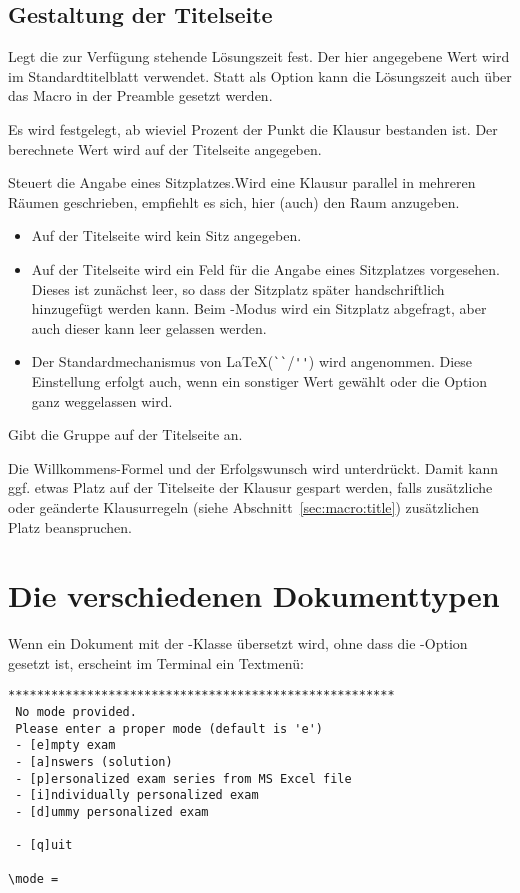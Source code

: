 \documentclass[
load=osgexam,
babel=ngerman
]{skdoc}
\begin{document}
\subsection*{Gestaltung der Titelseite}
Legt die zur Verfügung stehende Lösungszeit fest. Der hier angegebene Wert wird im Standardtitelblatt verwendet.
Statt als Option kann die Lösungszeit auch über das Macro  in der Preamble gesetzt werden.
\medskip

Es wird festgelegt, ab wieviel Prozent der Punkt die Klausur bestanden ist. Der berechnete Wert wird auf der Titelseite
angegeben.
\medskip

 Steuert die Angabe eines Sitzplatzes.Wird eine Klausur parallel in mehreren Räumen
geschrieben, empfiehlt es sich, hier (auch) den Raum anzugeben.
\begin{itemize}[nosep]
  \item [\opt{no}] Auf der Titelseite wird kein Sitz angegeben.
  \item [\opt{title}] Auf der Titelseite wird ein Feld für die Angabe eines
    Sitzplatzes vorgesehen. Dieses ist zunächst leer, so dass der Sitzplatz
    später handschriftlich hinzugefügt werden kann. Beim -Modus
    wird ein Sitzplatz abgefragt, aber auch dieser kann leer gelassen werden.
  \item [\opt{latex}]  Der Standardmechanismus von \LaTeX (\verb!``!/\verb!''!) wird angenommen. Diese Einstellung
    erfolgt auch, wenn ein sonstiger Wert gewählt oder die Option ganz weggelassen wird.
\end{itemize}

\medskip
{}Gibt die Gruppe auf der Titelseite an.
\medskip

Die Willkommens-Formel und der Erfolgswunsch wird unterdrückt. Damit kann ggf. etwas Platz auf der
Titelseite der Klausur gespart werden, falls zusätzliche oder geänderte Klausurregeln (siehe Abschnitt~\ref{sec:macro:title})
zusätzlichen Platz beanspruchen. 
\medskip


\section{Die verschiedenen Dokumenttypen}
Wenn ein Dokument mit der \thepkg-Klasse übersetzt wird, ohne dass die -Option gesetzt ist, erscheint
im Terminal ein Textmenü:
\begin{verbatim}
******************************************************
 No mode provided.
 Please enter a proper mode (default is 'e') 
 - [e]mpty exam
 - [a]nswers (solution)
 - [p]ersonalized exam series from MS Excel file
 - [i]ndividually personalized exam
 - [d]ummy personalized exam

 - [q]uit 

\mode =
\end{verbatim}
\end{document}

